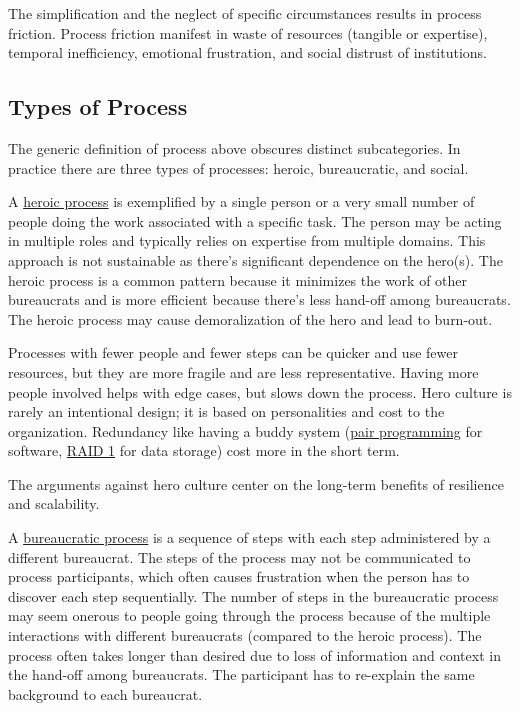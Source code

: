 The simplification and the neglect of specific circumstances results in process friction. Process friction manifest in waste of resources (tangible or expertise), temporal inefficiency, emotional frustration, and social distrust of institutions.



\subsection{Types of Process}
The generic definition of process above obscures distinct subcategories. In practice there are three types of processes: heroic, bureaucratic, and social.

A \underline{heroic process} is exemplified by a single person or a very small number of people doing the work associated with a specific task. The person may be acting in multiple roles and typically relies on expertise from multiple domains. This approach is not sustainable as there's significant dependence on the hero(s). The heroic process is a common pattern because it minimizes the work of other bureaucrats and is more efficient because there's less hand-off among bureaucrats. The heroic process may cause demoralization of the hero and lead to burn-out. 

Processes with fewer people and fewer steps can be quicker and use fewer resources, but they are more fragile and are less representative. Having more people involved helps with edge cases, but slows down the process.  Hero culture is rarely an intentional design; it is based on personalities and cost to the organization. Redundancy like having a buddy system (\href{https://en.wikipedia.org/wiki/Pair_programming}{pair programming} for software, \href{https://en.wikipedia.org/wiki/Standard_RAID_levels#RAID_1}{RAID 1} for data storage) cost more in the short term. 

The arguments against hero culture center on the long-term benefits of resilience and scalability.  

A \underline{bureaucratic process} is a sequence of steps with each step administered by a different bureaucrat. The steps of the process may not be communicated to process participants, which often causes frustration when the person has to discover each step sequentially. The number of steps in the bureaucratic process may seem onerous to people going through the process because of the multiple interactions with different bureaucrats (compared to the heroic process). The process often takes longer than desired due to loss of information and context in the hand-off among bureaucrats. The participant has to re-explain the same background to each bureaucrat.

